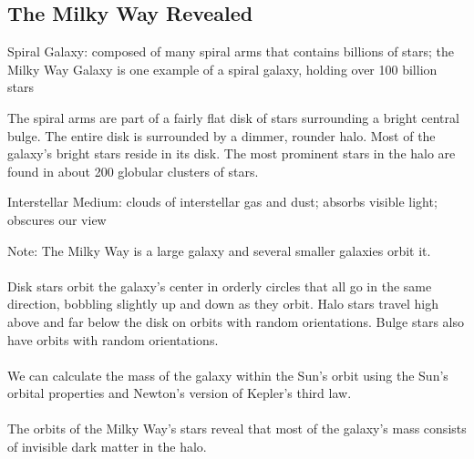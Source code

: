 \documentclass[12pt]{article}
\begin{document}
\subsection{The Milky Way Revealed} 
\begin{definition} Spiral Galaxy: composed of many spiral arms that contains billions of stars; the Milky Way Galaxy is one example of a spiral galaxy, holding over 100 billion stars \end{definition}
The spiral arms are part of a fairly flat disk of stars surrounding a bright central bulge. The entire disk is surrounded by a dimmer, rounder halo. Most of the galaxy's bright stars reside in its disk. The most prominent stars in the halo are found in about 200 globular clusters of stars. 
\begin{definition} Interstellar Medium: clouds of interstellar gas and dust; absorbs visible light; obscures our view \end{definition}
Note: The Milky Way is a large galaxy and several smaller galaxies orbit it. \\~\\
Disk stars orbit the galaxy's center in orderly circles that all go in the same direction, bobbling slightly up and down as they orbit. Halo stars travel high above and far below the disk on orbits with random orientations. Bulge stars also have orbits with random orientations. \\~\\
We can calculate the mass of the galaxy within the Sun's orbit using the Sun's orbital properties and Newton's version of Kepler's third law. \\~\\
The orbits of the Milky Way's stars reveal that most of the galaxy's mass consists of invisible dark matter in the halo. 
\end{document}
